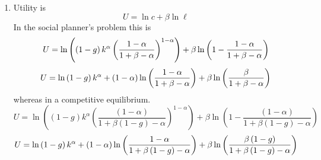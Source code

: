 \documentclass{article}
\begin{document}
\begin{enumerate}
\begin{enumerate}
\item Utility is%
\begin{equation*}
U=\ln c+\beta \ln \ell
\end{equation*}%
In the social planner's problem this is 
\begin{equation*}
U=\ln \left( \left( 1-g\right) k^{\alpha }\left( \frac{1-\alpha }{1+\beta
-\alpha }\right) ^{1-\alpha }\right) +\beta \ln \left( 1-\frac{1-\alpha }{%
1+\beta -\alpha }\right)
\end{equation*}%
\begin{equation*}
U=\ln \left( 1-g\right) k^{\alpha }+\left( 1-\alpha \right) \ln \left( \frac{%
1-\alpha }{1+\beta -\alpha }\right) +\beta \ln \left( \frac{\beta }{1+\beta
-\alpha }\right)
\end{equation*}%
whereas in a competitive equilibrium.%
\begin{equation*}
U=\ln \left( \left( 1-g\right) k^{\alpha }\left( \frac{\left( 1-\alpha
\right) }{1+\beta \left( 1-g\right) -\alpha }\right) ^{1-\alpha }\right)
+\beta \ln \left( 1-\frac{\left( 1-\alpha \right) }{1+\beta \left(
1-g\right) -\alpha }\right)
\end{equation*}%
\begin{equation*}
U=\ln \left( 1-g\right) k^{\alpha }+\left( 1-\alpha \right) \ln \left( \frac{%
1-\alpha }{1+\beta \left( 1-g\right) -\alpha }\right) +\beta \ln \left( 
\frac{\beta \left( 1-g\right) }{1+\beta \left( 1-g\right) -\alpha }\right)
\end{equation*}


\end{enumerate}
\end{enumerate}
\end{document}
